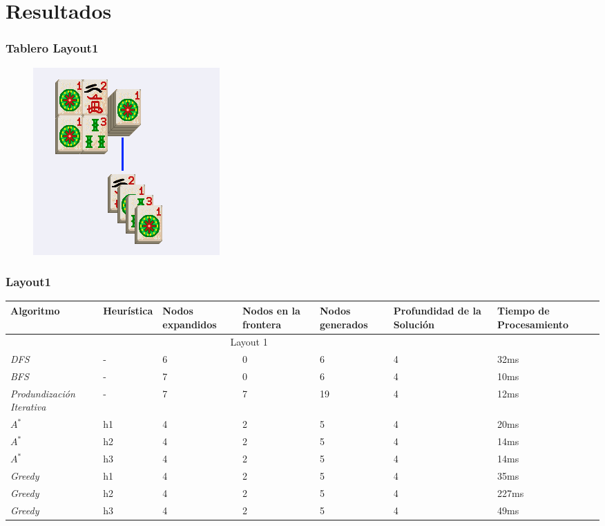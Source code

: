 \documentclass{beamer}
\begin{document}
\section{Resultados}

\begin{frame}
\frametitle{Tablero Layout1}
\begin{figure}[hb]
	\includegraphics[scale=0.3]{../Boards/Layout1.png}
\end{figure}
\end{frame}

\begin{frame}
\frametitle{Layout1}

\tiny{
\begin{table}[h]
\begin{center}
	\begin{tabular}{|p{1.3cm}|p{1.0cm}|p{1cm}|p{1cm}|p{1cm}|p{1cm}|p{2cm}|}
	\hline
	 Algoritmo & Heur\'istica & Nodos expandidos & Nodos en la frontera & Nodos generados & Profundidad de la Soluci\'on & Tiempo de Procesamiento\\
	\hline \hline
		 \multicolumn{6}{|c|}{Layout 1} \\
	\hline
	\textit{DFS} & - & 6 & 0 & 6 & 4 & 32ms \\
	\textit{BFS} & - & 7 & 0 & 6 & 4 & 10ms \\
	\textit{Produndizaci\'on Iterativa} & - & 7 &  7 & 19 & 4 & 12ms \\
	\textit{$A^*$} & h1 & 4 & 2 & 5 & 4 & 20ms \\
	\textit{$A^*$} & h2 & 4 & 2 & 5 & 4 & 14ms \\
	\textit{$A^*$} & h3 & 4 & 2 & 5 & 4 & 14ms \\
	\textit{Greedy} & h1 & 4 & 2 & 5 & 4 & 35ms\\
	\textit{Greedy} & h2 & 4 & 2 & 5 & 4 & 227ms\\
	\textit{Greedy} & h3 & 4 & 2 & 5 & 4 & 49ms\\

	\hline
	\end{tabular}
\end{center}
\label{tab:costLayout1}
\end{table}}

\end{frame}
\end{document}
